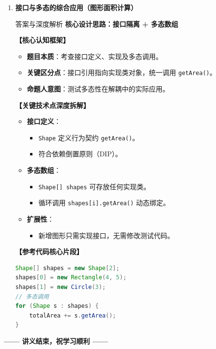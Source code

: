 ﻿\documentclass[12pt, a4paper]{ctexart}
\newcommand{\code}[1]{\texttt{#1}}
\begin{document}
\begin{enumerate}[label=\textbf{\arabic*.}, leftmargin=*, itemsep=1.5em]
	\item \textbf{接口与多态的综合应用（图形面积计算）}
	      \begin{bluebox}{答案与深度解析}
		      \textbf{核心设计思路：接口隔离 + 多态数组}

		      \textbf{【核心认知框架】}
		      \begin{itemize}[leftmargin=*, nosep]
			      \item \textbf{题目本质}：考查接口定义、实现及多态调用。
			      \item \textbf{关键区分点}：接口引用指向实现类对象，统一调用 \code{getArea()}。
			      \item \textbf{命题人意图}：测试多态性在解耦中的实际应用。
		      \end{itemize}

		      \textbf{【关键技术点深度拆解】}
		      \begin{itemize}[leftmargin=*, nosep]
			      \item \textbf{接口定义}：
			            \begin{itemize}
				            \item \code{Shape} 定义行为契约 \code{getArea()}。
				            \item 符合依赖倒置原则（DIP）。
			            \end{itemize}
			      \item \textbf{多态数组}：
			            \begin{itemize}
				            \item \code{Shape[] shapes} 可存放任何实现类。
				            \item 循环调用 \code{shapes[i].getArea()} 动态绑定。
			            \end{itemize}
			      \item \textbf{扩展性}：
			            \begin{itemize}
				            \item 新增图形只需实现接口，无需修改测试代码。
			            \end{itemize}
		      \end{itemize}

		      \textbf{【参考代码核心片段】}
		      \begin{lstlisting}[language=Java]
Shape[] shapes = new Shape[2];
shapes[0] = new Rectangle(4, 5);
shapes[1] = new Circle(3);
// 多态调用
for (Shape s : shapes) {
    totalArea += s.getArea();
}
\end{lstlisting}
	      \end{bluebox}
\end{enumerate}

\vfill
\begin{center}
	\bfseries —— 讲义结束，祝学习顺利 ——
\end{center}
\end{document}

